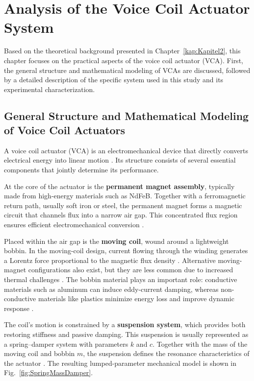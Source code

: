\chapter[Analysis of the Voice Coil Actuator System]{Analysis of the Voice Coil Actuator System}\label{kap:Kapitel3}
Based on the theoretical background presented in Chapter~\ref{kap:Kapitel2}, this chapter focuses on the practical aspects of the voice coil actuator (VCA). First, the general structure and mathematical modeling of VCAs are discussed, followed by a detailed description of the specific system used in this study and its experimental characterization.

\section{General Structure and Mathematical Modeling of Voice Coil Actuators}
A voice coil actuator (VCA) is an electromechanical device that directly converts electrical energy into linear motion \cite{Shewale.2018, Baronti.2009}. Its structure consists of several essential components that jointly determine its performance.

At the core of the actuator is the \textbf{permanent magnet assembly}, typically made from high-energy materials such as NdFeB. Together with a ferromagnetic return path, usually soft iron or steel, the permanent magnet forms a magnetic circuit that channels flux into a narrow air gap. This concentrated flux region ensures efficient electromechanical conversion \cite{Brown.2012}.

Placed within the air gap is the \textbf{moving coil}, wound around a lightweight bobbin. In the moving-coil design, current flowing through the winding generates a Lorentz force proportional to the magnetic flux density \cite{Wu.2015,Baronti.2009}. Alternative moving-magnet configurations also exist, but they are less common due to increased thermal challenges \cite{Shewale.2018}. The bobbin material plays an important role: conductive materials such as aluminum can induce eddy-current damping, whereas non-conductive materials like plastics minimize energy loss and improve dynamic response \cite{Abdullah.2020}.

The coil’s motion is constrained by a \textbf{suspension system}, which provides both restoring stiffness and passive damping. This suspension is usually represented as a spring–damper system with parameters $k$ and $c$. Together with the mass of the moving coil and bobbin $m$, the suspension defines the resonance characteristics of the actuator \cite{Wu.2015,Baronti.2009}. The resulting lumped-parameter mechanical model is shown in Fig.~\ref{fig:SpringMassDamper}.


